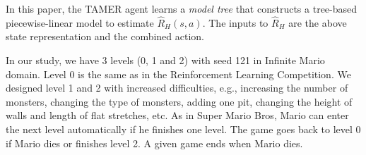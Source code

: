 \documentclass[10pt,journal,compsoc]{IEEEtran}
\begin{document}
In this paper, %
the TAMER agent learns a \emph{model tree} \cite{wang1996induction} that constructs a tree-based %
piecewise-linear model to estimate $\hat{R}_{H}(s, a)$.  
The inputs to $\hat{R}_{H}$ are the above state representation %
and the combined action. %


In our study, %
we have 3 levels (0, 1 and 2) with seed 121 %
in Infinite Mario domain. %
Level 0 is the same as in the Reinforcement Learning Competition. %
We designed level 1 and 2 %
with increased difficulties, e.g., increasing the number of monsters, changing the type of monsters, adding one pit, changing the height of walls and length of flat stretches, etc. As in Super Mario Bros, Mario can enter the next level automatically if he finishes one level. The game goes back to level 0 if Mario dies or finishes level 2. A given game ends when Mario dies. %
\end{document}
